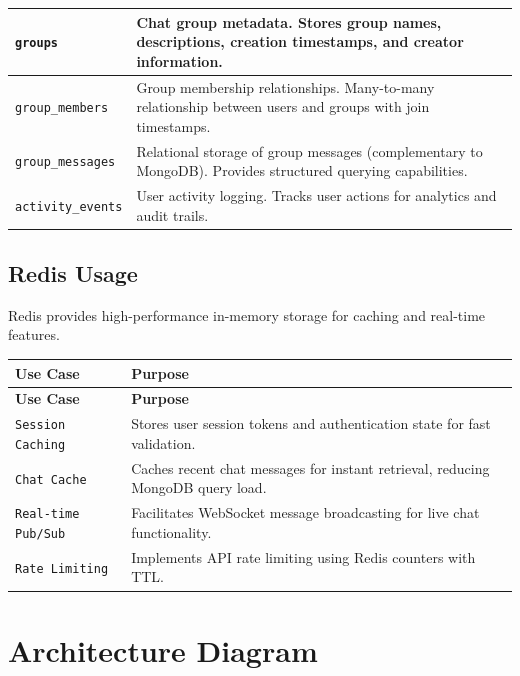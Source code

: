 \documentclass[11pt,a4paper]{article}
\begin{document}
\begin{longtable}{|p{4cm}|p{10cm}|}
\texttt{groups} & Chat group metadata. Stores group names, descriptions, creation timestamps, and creator information. \\
\hline

\texttt{group\_members} & Group membership relationships. Many-to-many relationship between users and groups with join timestamps. \\
\hline

\texttt{group\_messages} & Relational storage of group messages (complementary to MongoDB). Provides structured querying capabilities. \\
\hline

\texttt{activity\_events} & User activity logging. Tracks user actions for analytics and audit trails. \\
\hline

\end{longtable}

\subsection{\textcolor{redisred}{Redis Usage}}

Redis provides high-performance in-memory storage for caching and real-time features.

\begin{longtable}{|p{4cm}|p{10cm}|}
\hline
\rowcolor{redisred!20}
\textbf{Use Case} & \textbf{Purpose} \\
\hline
\endfirsthead

\hline
\rowcolor{redisred!20}
\textbf{Use Case} & \textbf{Purpose} \\
\hline
\endhead

\texttt{Session Caching} & Stores user session tokens and authentication state for fast validation. \\
\hline

\texttt{Chat Cache} & Caches recent chat messages for instant retrieval, reducing MongoDB query load. \\
\hline

\texttt{Real-time Pub/Sub} & Facilitates WebSocket message broadcasting for live chat functionality. \\
\hline

\texttt{Rate Limiting} & Implements API rate limiting using Redis counters with TTL. \\
\hline

\end{longtable}

\section{Architecture Diagram}
\end{document}
